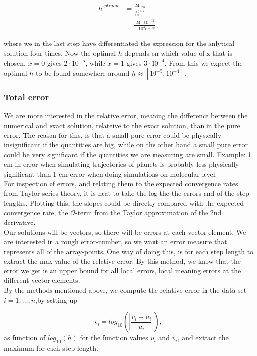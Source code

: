 \documentclass{article}
\begin{document}
\begin{align}
h^{optimal} &= \frac{24 \epsilon_{ro}}{f_0^{(4)}}\\
&= \frac{24 \cdot 10^{-16}}{-10^4 e^{-10x}},
\end{align}

where we in the last step have differentiated the expression for the anlytical solution four times. Now the optimal $h$ depends on which value of x that is chosen. $x = 0$ gives $2\cdot10^{-5}$, while $x = 1$ gives $3 \cdot 10^{-4}$. From this we expect the optimal $h$ to be found somewhere around $h \approx [10^{-5}, 10^{-4}]$.

\subsubsection{Total error}
We are more interested in the relative error, meaning the difference between the numerical and exact solution, relateive to the exact solution, than in the pure error. The reason for this, is that a small pure error could be physically insignificant if the quantities are big, while on the other hand a small pure error could be very significant if the quantities we are measuring are small. Example: 1 cm in error when simulating trajectories of planets is probably less physically significant than 1 cm error when doing simulations on molecular level.\\

For inspection of errors, and relating them to the expected convergence rates from Taylor series theory, it is neat to take the log the the errors and of the step lengths. Plotting this, the slopes could be directly compared with the expected convergence rate, the $\mathcal{O}$-term from the Taylor approximation of the 2nd derivative.\\

Our solutions will be vectors, so there will be errors at each vector element. We are interested in a rough error-number, so we want an error measure that represents all of the array-points. One way of doing this, is for each step length to extract the max value of the relative error. By this method, we know that the error we get is an upper bound for all local errors, local meaning errors at the different vector elements.\\

By the methods mentioned above, we compute the relative error in the data set $i=1,\dots, n$,by setting up

\[
\epsilon_i=log_{10}\left(\left|\frac{v_i-u_i}
{u_i}\right|\right),
\]
as function of $log_{10}(h)$ for the function values $u_i$ and $v_i$, and extract the maximum for each step length.
\end{document}
